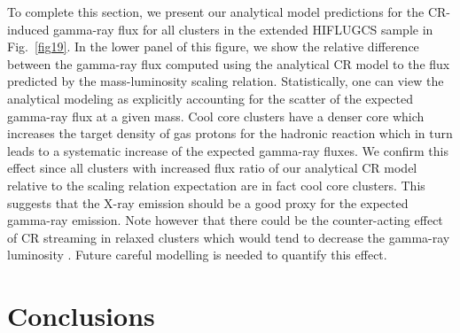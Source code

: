 \documentclass[10pt,aps,pra,reprint,amsmath,amsfonts,amssymb,showpacs,nofootinbib,floatfix]{revtex4-1}
\begin{document}
To complete this section, we present our analytical model predictions
for the CR-induced gamma-ray flux for all clusters in the extended
HIFLUGCS sample in Fig.~\ref{fig19}. In the lower panel of this
figure, we show the relative difference between the gamma-ray flux
computed using the analytical CR model to the flux predicted by the
mass-luminosity scaling relation. Statistically, one can view the
analytical modeling as explicitly accounting for the scatter of the expected
gamma-ray flux at a given mass. Cool core clusters have a denser core
which increases the target density of gas protons for the hadronic
reaction which in turn leads to a systematic increase of the expected
gamma-ray fluxes. We confirm this effect since all clusters with
increased flux ratio of our analytical CR model relative to the scaling relation
expectation are in fact cool core clusters. This suggests that the X-ray
emission should be a good proxy for the expected gamma-ray
emission. Note however that there could be the counter-acting effect
of CR streaming in relaxed clusters which would tend to decrease the
gamma-ray luminosity \cite{2011A&A...527A..99E}. Future careful
modelling is needed to quantify this effect.


\section{Conclusions}
\end{document}
